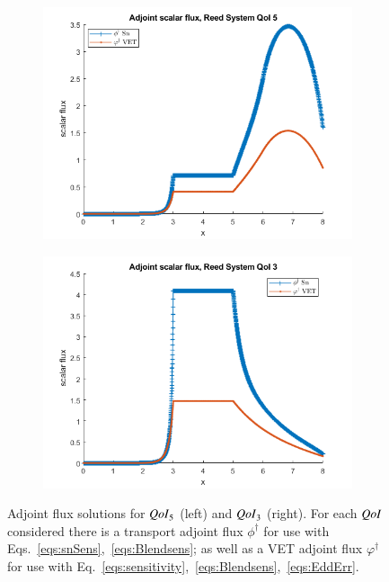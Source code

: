 \documentclass{anstrans}
\newcommand{\qoi}{{\it QoI}\xspace}
\begin{document}
\begin{figure}[H]
\centering
\begin{subfigure}{.25\textwidth}
  \centering
  \includegraphics[width=.98\linewidth]{774phia.png}
\end{subfigure}%
\begin{subfigure}{.25\textwidth}
  \centering
  \includegraphics[width=.98\linewidth]{772phia.png}
\end{subfigure}
\caption{Adjoint flux solutions for $\qoi_5$ (left) and $\qoi_3$ (right). For each $\qoi$ considered there is a transport adjoint flux $\phi^\dag$ for use with Eqs.~\eqref{eqs:snSens},~\eqref{eqs:Blendsens}; as well as a VET adjoint flux $\varphi^\dag$ for use with Eq.~\eqref{eqs:sensitivity},~\eqref{eqs:Blendsens},~\eqref{eqs:EddErr}.}
\label{fig:adj}
\end{figure}
\end{document}
